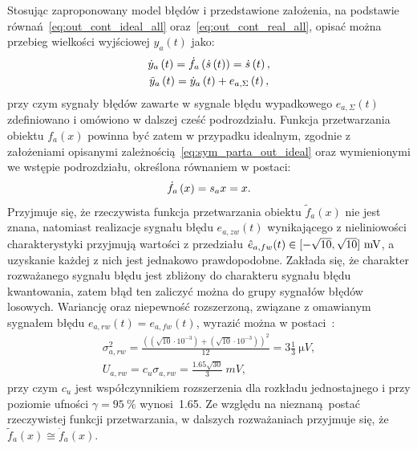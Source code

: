 Stosując zaproponowany model błędów i przedstawione założenia, na podstawie równań~\eqref{eq:out_cont_ideal_all} oraz~\eqref{eq:out_cont_real_all}, opisać można przebieg wielkości wyjściowej $y_{a}(t)$ jako:
\begin{gather}
\dot{y}_{a} \left(t\right) = \dot{f}_{a} \left(\dot{s} \left(t\right)\right) = \dot{s} \left(t\right) \label{eq:sym_parta_out_ideal}, \\
\tilde{y}_{a} \left(t\right) = \dot{y}_{a} \left(t\right) + e_{a,\Sigma} \left(t\right) \label{eq:sym_parta_out_real},
\end{gather}
przy czym sygnały błędów zawarte w sygnale błędu wypadkowego $e_{a,\Sigma}(t)$ zdefiniowano i omówiono w dalszej cześć podrozdziału. Funkcja przetwarzania obiektu $f_{a}(x)$ powinna być zatem w przypadku idealnym, zgodnie z założeniami opisanymi zależnością~\eqref{eq:sym_parta_out_ideal} oraz wymienionymi we wstępie podrozdziału, określona równaniem w postaci:
\begin{equation}
\dot{f}_{a} \left(x\right) = s_{a} x = x \label{eq:sym_parta_statfun}.
\end{equation}
Przyjmuje się, że rzeczywista funkcja przetwarzania obiektu $\tilde{f}_{a}(x)$ nie jest znana, natomiast realizacje sygnału błędu $e_{a,zw}(t)$ wynikającego z nieliniowości charakterystyki przyjmują wartości z przedziału $\hat{e}_{a,fw}(t) \in \interval{-\sqrt{10}}{\sqrt{10}}~\unit{mV}$, a uzyskanie każdej z nich jest jednakowo prawdopodobne. Zakłada się, że charakter rozważanego sygnału błędu jest zbliżony do charakteru sygnału błędu kwantowania, zatem błąd ten zaliczyć można do grupy sygnałów błędów losowych. Wariancję oraz niepewność rozszerzoną, związane z omawianym sygnałem błędu $e_{a,rw}(t) = e_{a,fw}(t)$, wyrazić można w postaci~\cite{jcgm_guide}:
\begin{gather}
\sigma_{a,rw}^{2} = \frac{\left( \left( \sqrt{10} \cdot 10^{-3} \right) + \left( \sqrt{10} \cdot 10^{-3} \right) \right)^{2}}{12} = 3 \frac{1}{3}~\unit{\micro V} \label{eq:sym_parta_rand_self_var}, \\
U_{a,rw} = c_{u} \sigma_{a,rw} = \frac{\num{1.65} \sqrt{30}}{3}~\unit{mV} \label{eq:sym_parta_rand_self_unc},
\end{gather}
przy czym $c_{u}$ jest współczynnikiem rozszerzenia dla rozkładu jednostajnego i przy poziomie ufności $\gamma = \qty{95}{\percent}$ wynosi~\num{1.65}. Ze względu na nieznaną postać rzeczywistej funkcji przetwarzania, w dalszych rozważaniach przyjmuje się, że $\tilde{f}_{a}(x)  \cong  \dot{f}_{a}(x)$.

